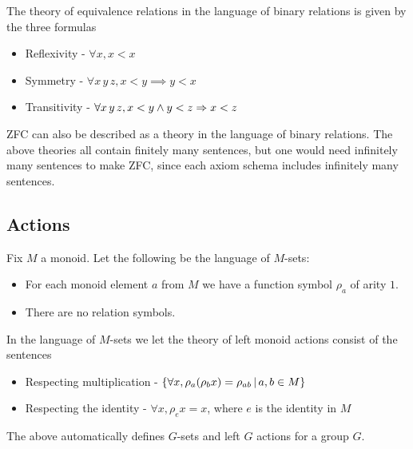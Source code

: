 \begin{dfn}
    The theory of equivalence relations in the language of binary relations
    is given by the three formulas
    \begin{itemize}
      \item Reflexivity - $\forall x, x < x$
      \item Symmetry - $\forall x \, y \, z, x < y \implies y < x$
      \item Transitivity - $\forall x \, y \, z, x < y \land y < z \Rightarrow x < z$
    \end{itemize}
\end{dfn}

ZFC can also be described as a theory in the language of binary relations.
The above theories all contain finitely many sentences,
but one would need infinitely many sentences to make ZFC,
since each axiom schema includes infinitely many sentences.

\subsection{Actions}

\begin{dfn}
  Fix $M$ a monoid.
  Let the following be the language of $M$-sets:
  \begin{itemize}
    \item For each monoid element $a$ from $M$
          we have a function symbol $\rho_{a}$ of arity $1$.
    \item There are no relation symbols.
  \end{itemize}

  In the language of $M$-sets we let the theory of left monoid actions consist of
  the sentences
  \begin{itemize}
    \item Respecting multiplication - $\left\{ \forall x, \rho_{a}(\rho_{b} x) = \rho_{ab} \,|\, a , b \in M\right\}$
    \item Respecting the identity - $ \forall x, \rho_{e} x = x$, where $e$ is the identity in $M$
  \end{itemize}

  The above automatically defines $G$-sets and left $G$ actions for a group $G$.
\end{dfn}

